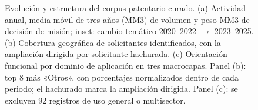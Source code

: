 \begin{figure}[!htbp]
  \caption[Evolución y estructura del corpus patentario curado.]{Evolución y
  estructura del corpus patentario curado. (a) Actividad anual, media móvil de
  tres años (MM3) de volumen y peso MM3 de decisión de misión; inset: cambio
  temático 2020--2022 $\rightarrow$ 2023--2025. (b) Cobertura geográfica de
  solicitantes identificados, con la ampliación dirigida por solicitante
  hachurada. (c) Orientación funcional por dominio de aplicación en tres
  macrocapas. Panel (b): top 8 más «Otros», con porcentajes normalizados dentro
  de cada periodo; el hachurado marca la ampliación dirigida. Panel (c): se
  excluyen 92 registros de uso general o multisector.}
  \label{fig:results-patents}
\end{figure}
